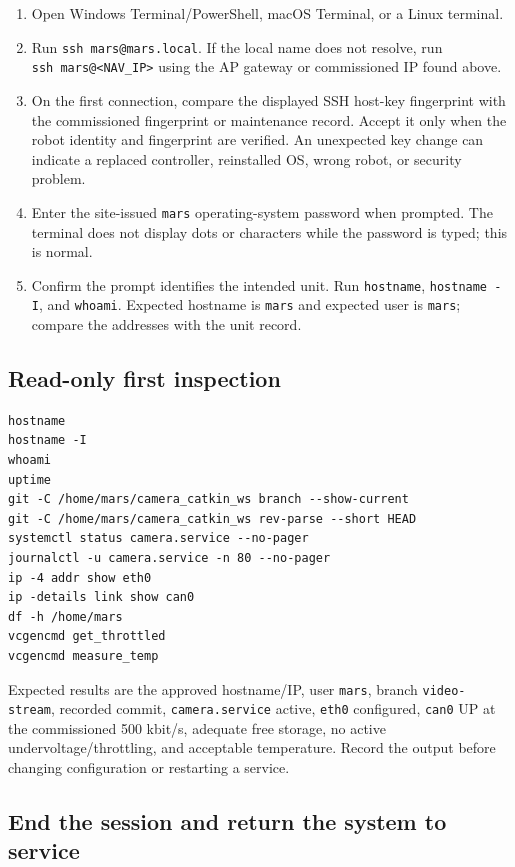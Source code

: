 \documentclass[
  10pt,
  letterpaper,
  openany]{report}
\providecommand{\tightlist}{%
  \setlength{\itemsep}{0pt}\setlength{\parskip}{0pt}}
\begin{document}
\begin{enumerate}
\tightlist
\item
  Open Windows Terminal/PowerShell, macOS Terminal, or a Linux terminal.
\item
  Run \texttt{ssh\ mars@mars.local}. If the local name does not resolve,
  run \texttt{ssh\ mars@\textless{}NAV\_IP\textgreater{}} using the AP
  gateway or commissioned IP found above.
\item
  On the first connection, compare the displayed SSH host-key
  fingerprint with the commissioned fingerprint or maintenance record.
  Accept it only when the robot identity and fingerprint are verified.
  An unexpected key change can indicate a replaced controller,
  reinstalled OS, wrong robot, or security problem.
\item
  Enter the site-issued \texttt{mars} operating-system password when
  prompted. The terminal does not display dots or characters while the
  password is typed; this is normal.
\item
  Confirm the prompt identifies the intended unit. Run
  \texttt{hostname}, \texttt{hostname\ -I}, and \texttt{whoami}.
  Expected hostname is \texttt{mars} and expected user is \texttt{mars};
  compare the addresses with the unit record.
\end{enumerate}

\subsection{Read-only first
inspection}\label{read-only-first-inspection}

\begin{verbatim}
hostname
hostname -I
whoami
uptime
git -C /home/mars/camera_catkin_ws branch --show-current
git -C /home/mars/camera_catkin_ws rev-parse --short HEAD
systemctl status camera.service --no-pager
journalctl -u camera.service -n 80 --no-pager
ip -4 addr show eth0
ip -details link show can0
df -h /home/mars
vcgencmd get_throttled
vcgencmd measure_temp
\end{verbatim}

Expected results are the approved hostname/IP, user \texttt{mars},
branch \texttt{video-stream}, recorded commit, \texttt{camera.service}
active, \texttt{eth0} configured, \texttt{can0} UP at the commissioned
500 kbit/s, adequate free storage, no active undervoltage/throttling,
and acceptable temperature. Record the output before changing
configuration or restarting a service.

\subsection{End the session and return the system to
service}\label{end-the-session-and-return-the-system-to-service}
\end{document}
